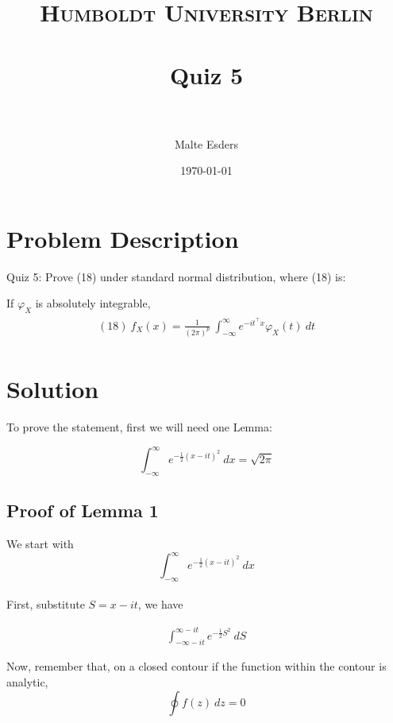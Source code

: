 \documentclass[paper=a4, fontsize=11pt]{scrartcl} %
\title{	
\normalfont \normalsize 
\textsc{Humboldt University Berlin} \\ [25pt] %
\horrule{0.5pt} \\[0.4cm] %
\huge Quiz 5 \\ %
\horrule{2pt} \\[0.5cm] %
}
\author{Malte Esders} %
\date{\normalsize\today} %
\numberwithin{equation}{section} %
\numberwithin{figure}{section} %
\numberwithin{table}{section} %
\begin{document}
\maketitle %

\section{Problem Description}
Quiz 5: Prove (18) under standard normal distribution, where (18) is:

If $\varphi_X$ is absolutely integrable,
\begin{align} 
\begin{split}
	(18)\  f_X(x) = \frac{1}{(2\pi)^p}\ \int_{-\infty}^{\infty}{e^{-it^\intercal x} \varphi_X(t)\ dt}
\end{split}					
\end{align}

\newpage

\section{Solution}


To prove the statement, first we will need one Lemma:

\begin{equation}
	\int_{-\infty}^{\infty}{e^{-\frac{1}{2}(x-it)^2}\ dx} = \sqrt{2\pi}
\end{equation}

\subsection{Proof of Lemma 1}
We start with
\begin{equation}
	\int_{-\infty}^{\infty}{e^{-\frac{1}{2}(x-it)^2}\ dx}
\end{equation}
\\

First, substitute $S = x-it$, we have

\begin{equation}
\begin{aligned}
	\int_{-\infty-it}^{\infty-it}{e^{-\frac{1}{2}S^2}\ dS}
\end{aligned}
\end{equation}

Now, remember that, on a closed contour if the function within the contour is analytic,
\begin{equation}
	\oint{f(z)\ dz} = 0
\end{equation}
\end{document}
